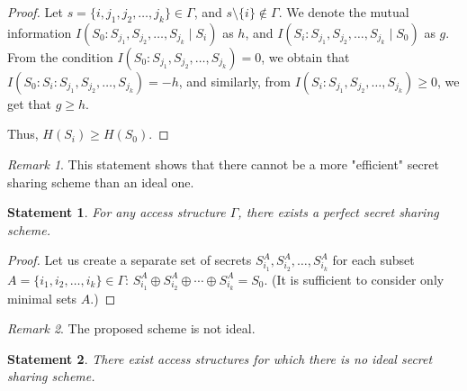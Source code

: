 \documentclass[12pt,sans]{article}
\newcommand{\seqn}[2]{{#1}_1,{#1}_2,\dotsc,{#1}_{#2}}
\newcommand{\seqin}[3]{{#1}_{{#2}_1},{#1}_{{#2}_2},\dotsc,{#1}_{{#2}_{#3}}}
\theoremstyle{definition}
\theoremstyle{plain}
\newtheorem{statement}{Statement}[section]
\theoremstyle{remark}
\newtheorem{remark}{Remark}[section]
\begin{document}
\begin{proof}
    Let $s=\{i, \seqn{j}{k}\} \in \Gamma$, and $s \setminus \{i\} \not\in \Gamma$.
    We denote the mutual information $I(S_0 : \seqin{S}{j}{k} \mid S_i)$ as $h$,
    and $I(S_i : \seqin{S}{j}{k} \mid S_0)$ as $g$. From the condition
    $I(S_0 : \seqin{S}{j}{k}) = 0$, we obtain that
    $I(S_0 : S_i : \seqin{S}{j}{k}) = -h$, and similarly, from
    $I(S_i : \seqin{S}{j}{k}) \ge 0$, we get that $g \ge h$.

    \begin{center}
    \end{center}
    Thus, $H(S_i) \ge H(S_0)$.
\end{proof}

\begin{remark}
    This statement shows that there cannot be a more "efficient" secret sharing scheme than an ideal one.
\end{remark}

\begin{statement}
    For any access structure $\Gamma$, there exists a perfect secret sharing scheme.
\end{statement}

\begin{proof}
    Let us create a separate set of secrets $S^A_{i_1}, S^A_{i_2}, \dotsc, S^A_{i_k}$ for each subset
    $A = \{\seqn{i}{k}\} \in \Gamma$: $S^A_{i_1} \oplus S^A_{i_2} \oplus \dotsb \oplus S^A_{i_k} = S_0$.
    (It is sufficient to consider only minimal sets $A$.)
\end{proof}

\begin{remark}
    The proposed scheme is not ideal.
\end{remark}

\begin{statement}
    There exist access structures for which there is no ideal secret sharing scheme.
\end{statement}
\end{document}
